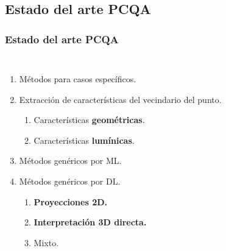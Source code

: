 \subsection{Estado del arte PCQA}
\begin{frame}
  \frametitle{Estado del arte PCQA}
  \begin{columns}
    \begin{enumerate}
      \item Métodos para casos específicos. 
      \item Extracción de características del vecindario del punto.
        \begin{enumerate}
          \item Características \textbf{geométricas}.
          \item Características \textbf{lumínicas}.
        \end{enumerate}
      \item Métodos genéricos por ML. 
      \item Métodos genéricos por DL.
        \begin{enumerate}
          \item \textbf{Proyecciones 2D.}
          \item \textbf{Interpretación 3D directa.}
          \item Mixto.
        \end{enumerate}
    \end{enumerate}


\end{columns}
\end{frame}
